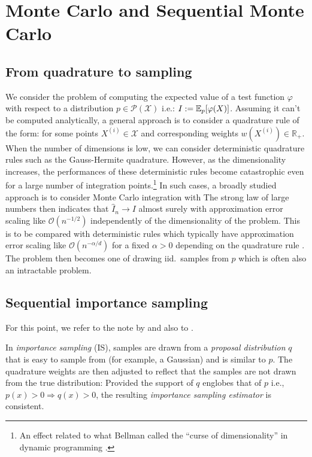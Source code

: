 
\section{Monte Carlo and Sequential Monte Carlo}
\subsection{From quadrature to sampling}
We consider the problem of computing the expected value of a test function $\varphi$ with respect to a distribution $p\in\mathcal P(\mathcal X)$ i.e.: $I:=\mathbb E_p[\varphi(X)]$. Assuming it can't be computed analytically, a general approach is to consider a quadrature rule of the form:
%
%
for some points $X^{(i)}\in\mathcal X$ and corresponding weights $w(X^{(i)})\in\mathbb R_+$. 
When the number of dimensions is low, we can consider deterministic quadrature rules such as the Gauss-Hermite quadrature. 
However, as the dimensionality increases, the performances of these deterministic rules become catastrophic even for a large number of integration points.\footnote{An effect related to what Bellman called the ``curse of dimensionality'' in dynamic programming \citep{bellman57}.} 
In such cases, a broadly studied approach is to consider Monte Carlo integration with
%
%
The strong law of large numbers then indicates that $\widehat I_n\to I$ almost surely with approximation error scaling like $\mathcal O(n^{-1/2})$ independently of the dimensionality of the problem. This is to be compared with deterministic rules which typically have approximation error scaling like $\mathcal O(n^{-\alpha/d})$ for a fixed $\alpha>0$ depending on the quadrature rule \citep{caflisch98}. The problem then becomes one of drawing iid.\ samples from $p$ which is often also an intractable problem.

\subsection{Sequential importance sampling}
For this point, we refer to the note by \citet{doucet11} and also to \citet[chapter 3.3 and 14.3]{robert04}.

In \emph{importance sampling} (IS), samples are drawn from a \emph{proposal distribution} $q$ that is easy to sample from (for example, a Gaussian) and is similar to $p$. 
The quadrature weights are then adjusted to reflect that the samples are not drawn from the true distribution:
%
%
Provided the support of $q$ englobes that of $p$ i.e., $p(x)>0\Rightarrow q(x)>0$, the resulting \emph{importance sampling estimator} is consistent.


